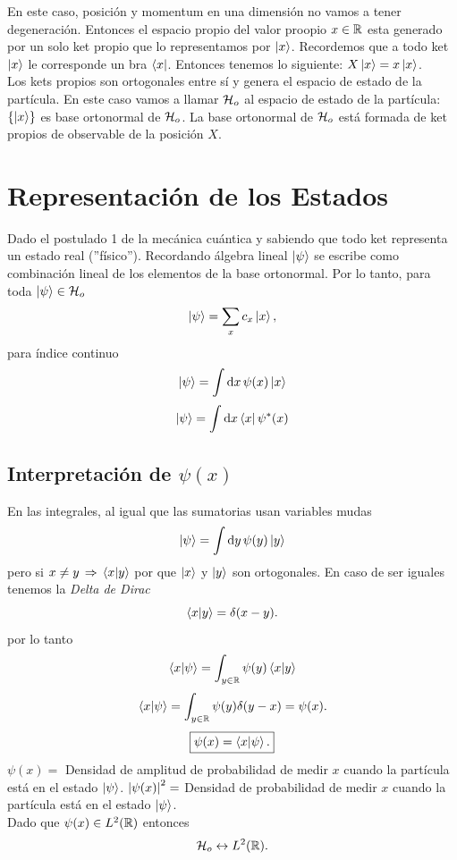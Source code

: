 En este caso, posición y momentum en una dimensión no vamos a tener degeneración. Entonces el espacio propio del valor proopio $x\in \mathbb{R}$ esta generado por un solo ket propio que lo representamos por $\ket{x}$. Recordemos que a todo ket $\ket{x}$ le corresponde un bra $\bra{x}$. Entonces tenemos lo siguiente: $X\ket{x} = x\ket{x}$.\\

Los kets propios son ortogonales entre sí y genera el espacio de estado de la partícula. En este caso vamos a llamar $\mathcal{H} _o$ al espacio de estado de la partícula: $\{ \ket{x} \}$ es base ortonormal de $\mathcal{H} _o$. La base ortonormal de $\mathcal{H} _o$ está formada de ket propios de observable de la posición $X$.


\section{Representación de los Estados}
Dado el postulado 1 de la mecánica cuántica y sabiendo que todo ket representa un estado real (''físico''). Recordando álgebra lineal $\ket{\psi}$ se escribe como combinación lineal de los elementos de la base ortonormal. Por lo tanto, para toda $\ket{\psi} \in \mathcal{H} _o$
    $$ \ket{\psi} = \sum _x c_x \ket{x}, $$
para índice continuo
    $$ \ket{\psi} = \int \dd{x} \psi (x) \ket{x} $$
    $$ \ket{\psi} = \int \dd{x} \bra{x} \psi ^* (x) $$
    
\subsection{Interpretación de $\psi (x)$}
En las integrales, al igual que las sumatorias usan variables mudas
    $$ \ket{\psi} = \int \dd{y} \psi (y) \ket{y} $$
pero si $x\neq y \, \Rightarrow \, \braket{x}{y}$ por que $\ket{x}$ y $\ket{y}$ son ortogonales. En caso de ser iguales tenemos la \textit{Delta de Dirac}
    $$ \braket{x}{y} = \delta (x - y). $$
por lo tanto
    $$ \braket{x}{\psi} = \int _{y\in \mathbb{R}} \psi (y) \braket{x}{y} $$
    $$ \braket{x}{\psi} = \int _{y\in \mathbb{R}} \psi (y) \delta (y - x) = \psi (x). $$
    $$ \boxed{ \psi (x) = \braket{x}{\psi}. } $$
$\psi (x) = $ Densidad de amplitud de probabilidad de medir $x$ cuando la partícula está en el estado $\ket{\psi}$. $\abs{\psi (x)}^2 = $ Densidad de probabilidad de medir $x$ cuando la partícula está en el estado $\ket{\psi}$. \\

Dado que $\psi (x) \in L^2 (\mathbb{R})$ entonces
    $$ \mathcal{H} _o \leftrightarrow L^2 (\mathbb{R}). $$

